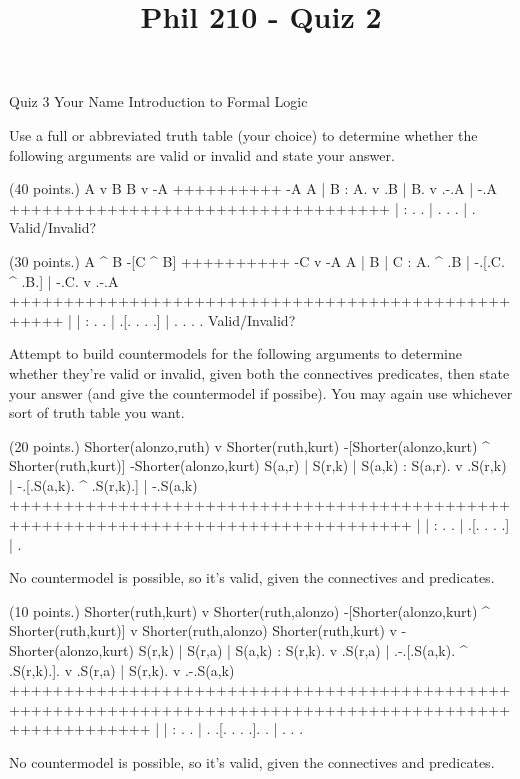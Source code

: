 
\title{Phil 210 - Quiz 2}

\heading
Quiz 3
Your Name
Introduction to Formal Logic
\endheading

Use a full or abbreviated truth table (your choice) to determine whether the following arguments are valid or invalid and state your answer.

\problems
{} (40 points.)
\argument
 A v B
 B v -A
++++++++++
 -A
\endargument
        \answer
        \truthtable
         A | B : A. v .B | B. v .-.A | -.A
        +++++++++++++++++++++++++++++++++++
           |   :  .   .  |  .   . .  |  . 
        \endtruthtable
        Valid/Invalid?
        \endanswer

 (30 points.)
\argument
 A ^ B
 -[C ^ B]
++++++++++
 -C v -A
\endargument
        \answer
        \truthtable
         A | B | C : A. ^ .B | -.[.C. ^ .B.] | -.C. v .-.A
        +++++++++++++++++++++++++++++++++++++++++++++++++++
           |   |   :  .   .  |  .[. .   . .] |  . .   . . 
        \endtruthtable
        Valid/Invalid?
        \endanswer

\endproblems

Attempt to build countermodels for the following arguments to determine whether they're valid or invalid, given both the connectives predicates, then state your answer (and give the countermodel if possibe). You may again use whichever sort of truth table you want.

\problems
{} (20 points.)
\argument
 Shorter(alonzo,ruth) v Shorter(ruth,kurt)
 -[Shorter(alonzo,kurt) ^ Shorter(ruth,kurt)]
\argumentline
 -Shorter(alonzo,kurt)
\endargument
        \answer
        \truthtable
         S(a,r) | S(r,k) | S(a,k) : S(a,r). v .S(r,k) | -.[.S(a,k). ^ .S(r,k).] | -.S(a,k)
        +++++++++++++++++++++++++++++++++++++++++++++++++++++++++++++++++++++++++++++++++++
                |        |        :       .   .       |  .[.      .   .      .] |  .   
        \endtruthtable

        \heightmodel
        
        \endheightmodel
        \OR
        No countermodel is possible, so it's valid, given the connectives and predicates.
        \endanswer

 (10 points.)
\argument
 Shorter(ruth,kurt) v Shorter(ruth,alonzo)
 -[Shorter(alonzo,kurt) ^ Shorter(ruth,kurt)] v Shorter(ruth,alonzo)
\argumentline
 Shorter(ruth,kurt) v -Shorter(alonzo,kurt)
\endargument
        \answer{}
        \truthtable
         S(r,k) | S(r,a) | S(a,k) : S(r,k). v .S(r,a) | .-.[.S(a,k). ^ .S(r,k).]. v .S(r,a) | S(r,k). v .-.S(a,k)
        +++++++++++++++++++++++++++++++++++++++++++++++++++++++++++++++++++++++++++++++++++++++++++++++++++++++++
                |        |        :       .   .       | . .[.      .   .      .].   .       |       .   . .   
        \endtruthtable

        \heightmodel
        
        \endheightmodel
        \OR
        No countermodel is possible, so it's valid, given the connectives and predicates.
        \endanswer

\endproblems
\bye
